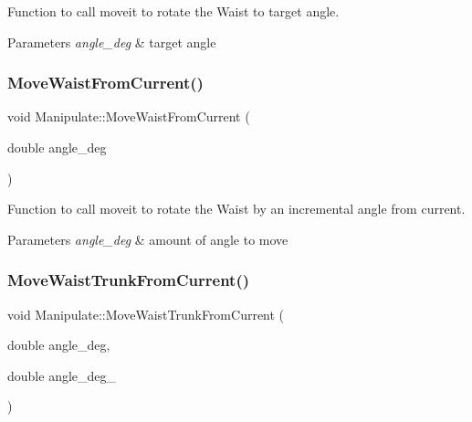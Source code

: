 Function to call moveit to rotate the Waist to target angle. 


\begin{DoxyParams}{Parameters}
{\em angle\+\_\+deg} & target angle \\
\hline
\end{DoxyParams}
\mbox{\label{structManipulate_af8c10b24461040330efbe1d163b455f7}} 
\subsubsection{\texorpdfstring{Move\+Waist\+From\+Current()}{MoveWaistFromCurrent()}}
{\footnotesize\ttfamily void Manipulate\+::\+Move\+Waist\+From\+Current (\begin{DoxyParamCaption}\item[{double}]{angle\+\_\+deg }\end{DoxyParamCaption})\hspace{0.3cm}{\ttfamily [private]}}



Function to call moveit to rotate the Waist by an incremental angle from current. 


\begin{DoxyParams}{Parameters}
{\em angle\+\_\+deg} & amount of angle to move \\
\hline
\end{DoxyParams}
\mbox{\label{structManipulate_a4b1a50327ead8dd1414718942b36d7e6}} 
\subsubsection{\texorpdfstring{Move\+Waist\+Trunk\+From\+Current()}{MoveWaistTrunkFromCurrent()}}
{\footnotesize\ttfamily void Manipulate\+::\+Move\+Waist\+Trunk\+From\+Current (\begin{DoxyParamCaption}\item[{double}]{angle\+\_\+deg,  }\item[{double}]{angle\+\_\+deg\+\_ }\end{DoxyParamCaption})\hspace{0.3cm}{\ttfamily [private]}}



